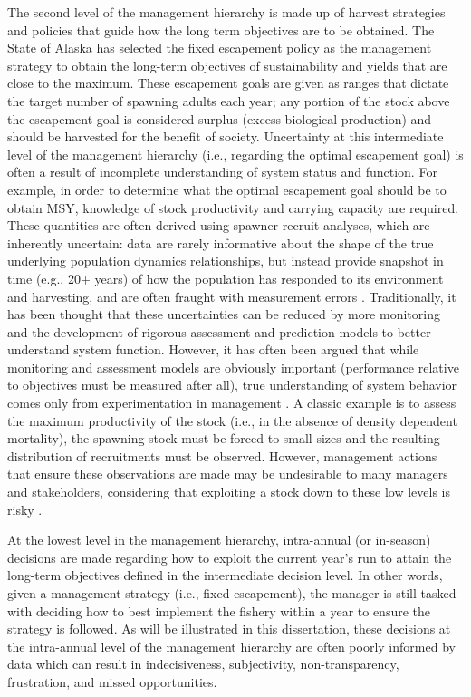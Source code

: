\documentclass[12pt,]{book}
\theoremstyle{definition}
\theoremstyle{definition}
\theoremstyle{definition}
\theoremstyle{remark}
\begin{document}
The second level of the management hierarchy is made up of harvest
strategies and policies that guide how the long term objectives are to
be obtained. The State of Alaska has selected the fixed escapement
policy as the management strategy to obtain the long-term objectives of
sustainability and yields that are close to the maximum. These
escapement goals are given as ranges that dictate the target number of
spawning adults each year; any portion of the stock above the escapement
goal is considered surplus (excess biological production) and should be
harvested for the benefit of society. Uncertainty at this intermediate
level of the management hierarchy (i.e., regarding the optimal
escapement goal) is often a result of incomplete understanding of system
status and function. For example, in order to determine what the optimal
escapement goal should be to obtain MSY, knowledge of stock productivity
and carrying capacity are required. These quantities are often derived
using spawner-recruit analyses, which are inherently uncertain: data are
rarely informative about the shape of the true underlying population
dynamics relationships, but instead provide snapshot in time (e.g., 20+
years) of how the population has responded to its environment and
harvesting, and are often fraught with measurement errors
\citep{walters-martell-2004}. Traditionally, it has been thought that
these uncertainties can be reduced by more monitoring and the
development of rigorous assessment and prediction models to better
understand system function. However, it has often been argued that while
monitoring and assessment models are obviously important (performance
relative to objectives must be measured after all), true understanding
of system behavior comes only from experimentation in management
\citep[the concept of ``active adaptive management'';][]{walters-1986}.
A classic example is to assess the maximum productivity of the stock
(i.e., in the absence of density dependent mortality), the spawning
stock must be forced to small sizes and the resulting distribution of
recruitments must be observed. However, management actions that ensure
these observations are made may be undesirable to many managers and
stakeholders, considering that exploiting a stock down to these low
levels is risky \citep{walters-1986}.

At the lowest level in the management hierarchy, intra-annual (or
in-season) decisions are made regarding how to exploit the current
year's run to attain the long-term objectives defined in the
intermediate decision level. In other words, given a management strategy
(i.e., fixed escapement), the manager is still tasked with deciding how
to best implement the fishery within a year to ensure the strategy is
followed. As will be illustrated in this dissertation, these decisions
at the intra-annual level of the management hierarchy are often poorly
informed by data which can result in indecisiveness, subjectivity,
non-transparency, frustration, and missed opportunities.
\end{document}

